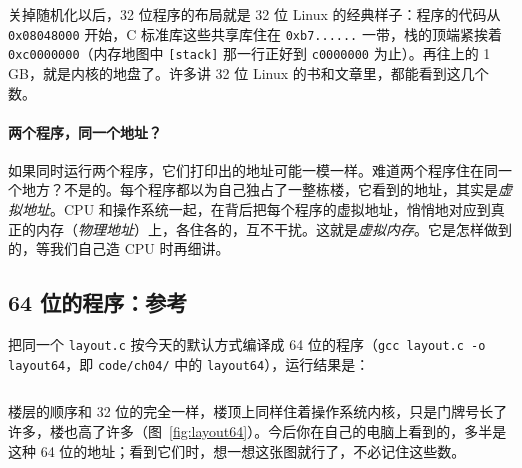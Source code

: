 关掉随机化以后，32 位程序的布局就是 32 位 Linux 的经典样子：程序的代码从 \texttt{0x08048000} 开始，C 标准库这些共享库住在 \texttt{0xb7......} 一带，栈的顶端紧挨着 \texttt{0xc0000000}（内存地图中 \texttt{[stack]} 那一行正好到 \texttt{c0000000} 为止）。再往上的 1\,GB，就是内核的地盘了。许多讲 32 位 Linux 的书和文章里，都能看到这几个数。

\paragraph{两个程序，同一个地址？}
如果同时运行两个程序，它们打印出的地址可能一模一样。难道两个程序住在同一个地方？不是的。每个程序都以为自己独占了一整栋楼，它看到的地址，其实是\emph{虚拟地址}。CPU 和操作系统一起，在背后把每个程序的虚拟地址，悄悄地对应到真正的内存（\emph{物理地址}）上，各住各的，互不干扰。这就是\emph{虚拟内存}。它是怎样做到的，等我们自己造 CPU 时再细讲。

\subsection{64 位的程序：参考}
\label{sec:layout64}

把同一个 \texttt{layout.c} 按今天的默认方式编译成 64 位的程序（\texttt{gcc layout.c -o layout64}，即 \texttt{code/ch04/} 中的 \texttt{layout64}），运行结果是：
\inputminted[linenos=false]{text}{code/ch04/out/layout64.txt}

楼层的顺序和 32 位的完全一样，楼顶上同样住着操作系统内核，只是门牌号长了许多，楼也高了许多（图~\ref{fig:layout64}）。今后你在自己的电脑上看到的，多半是这种 64 位的地址；看到它们时，想一想这张图就行了，不必记住这些数。

